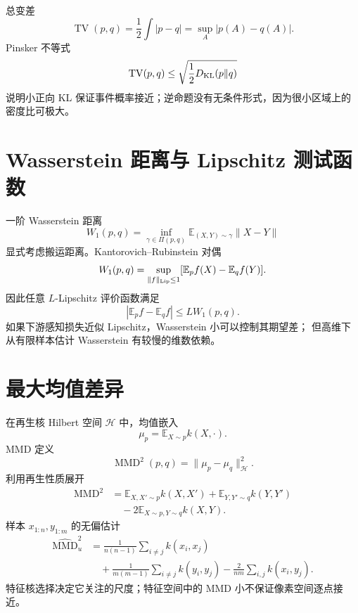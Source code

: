 \documentclass[11pt]{article}
\numberwithin{equation}{section}
\newcommand{\E}{\mathbb{E}}
\newcommand{\1}{\mathbf{1}}
\begin{document}
总变差
\begin{equation}
 \operatorname{TV}(p,q)=\frac12\int|p-q|
 =\sup_A|p(A)-q(A)|.
\end{equation}
Pinsker 不等式
\begin{equation}
 \operatorname{TV}(p,q)
 \le\sqrt{\frac12D_{\rm KL}(p\|q)}
\end{equation}
说明小正向 KL 保证事件概率接近；逆命题没有无条件形式，因为很小区域上的密度比可极大。

\section{Wasserstein 距离与 Lipschitz 测试函数}

一阶 Wasserstein 距离
\begin{equation}
 W_1(p,q)=\inf_{\gamma\in\Pi(p,q)}
 \E_{(X,Y)\sim\gamma}\|X-Y\|
\end{equation}
显式考虑搬运距离。Kantorovich--Rubinstein 对偶
\begin{equation}
 W_1(p,q)=\sup_{\|f\|_{\rm Lip}\le1}
 [\E_pf(X)-\E_qf(Y)].
\end{equation}
因此任意 $L$-Lipschitz 评价函数满足
\begin{equation}
 |\E_pf-\E_qf|\le L W_1(p,q).
\end{equation}
如果下游感知损失近似 Lipschitz，Wasserstein 小可以控制其期望差；
但高维下从有限样本估计 Wasserstein 有较慢的维数依赖。

\section{最大均值差异}

在再生核 Hilbert 空间 $\mathcal H$ 中，均值嵌入
\begin{equation}
 \mu_p=\E_{X\sim p}k(X,\cdot).
\end{equation}
MMD 定义
\begin{equation}
 \operatorname{MMD}^2(p,q)=\|\mu_p-\mu_q\|_{\mathcal H}^2.
\end{equation}
利用再生性质展开
\begin{align}
 \operatorname{MMD}^2
 &=\E_{X,X'\sim p}k(X,X')
 +\E_{Y,Y'\sim q}k(Y,Y')\\
 &\quad-2\E_{X\sim p,Y\sim q}k(X,Y).
\end{align}
样本 $x_{1:n},y_{1:m}$ 的无偏估计
\begin{align}
 \widehat{\operatorname{MMD}}_u^2
 &=\frac1{n(n-1)}\sum_{i\ne j}k(x_i,x_j)\\
 &\quad+\frac1{m(m-1)}\sum_{i\ne j}k(y_i,y_j)
 -\frac2{nm}\sum_{i,j}k(x_i,y_j).
\end{align}
特征核选择决定它关注的尺度；特征空间中的 MMD 小不保证像素空间逐点接近。
\end{document}
